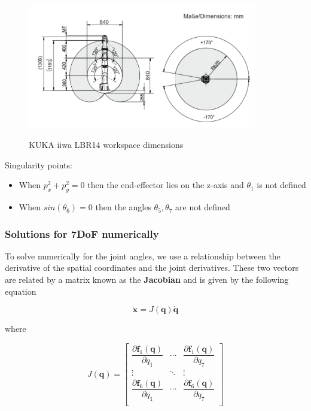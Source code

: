 \begin{center}
\begin{figure}[H]
\centering
\includegraphics[width=10cm]{images/iiwa-workspace.png}\\
\caption{KUKA iiwa LBR14 workspace dimensions}
\end{figure}
\end{center}

Singularity points:
\begin{itemize}
	\item When $p_x^2 + p_y^2 = 0$ then the end-effector lies on the z-axis and $θ_1$ is not defined
	\item When $sin\left( θ_6 \right) = 0$ then the angles $θ_5, θ_7$ are not defined
\end{itemize}

\subsubsection{Solutions for 7DoF numerically}

To solve numerically for the joint angles, we use a relationship between the derivative of the spatial coordinates and the joint derivatives. These two vectors 
are related by a matrix known as the \textbf{Jacobian} and is given by the following equation

\begin{equation}
\mathbf{\dot{x}} = J( \mathbf{q} ) \mathbf{\dot{q}}
\end{equation}

where

\begin{equation}
J( \mathbf{q} ) = \begin{bmatrix}
\dfrac{\partial \mathbf{f}_1(\mathbf{q})}{\partial q_{1}} & \cdots & \dfrac{\partial \mathbf{f}_1(\mathbf{q})}{\partial q_{7}} \\
\vdots & \ddots & \vdots \\
\dfrac{\partial \mathbf{f}_6(\mathbf{q})}{\partial q_{1}} & \cdots & \dfrac{\partial \mathbf{f}_6(\mathbf{q})}{\partial q_{7}} \\
\end{bmatrix}
\end{equation}

